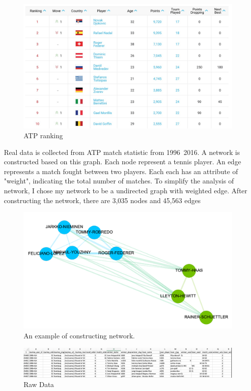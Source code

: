 \documentclass[runningheads]{llncs}
\begin{document}
\begin{figure}[H]
\centering
\includegraphics[scale=0.4]{ATP_ranking}
\caption{ATP ranking} \label{fig_0_atp_ranking}
\end{figure}


Real data is collected from ATP match statistic from 1996~2016. A network is constructed based on this graph. 
Each node represent a tennis player. An edge represents a match fought between two players. Each each has an attribute of "weight", indicating the total number of matches.
To simplify the analysis of network, I chose my network to be a undirected graph with weighted edge.
After constructing the network, there are 3,035 nodes and 45,563 edges

\begin{figure}[H]
\centering
\includegraphics[scale=0.4]{0_simple_example}
\caption{An example of constructing network.} \label{fig_0_simple_example}
\end{figure}

\begin{figure}[H]
\includegraphics[width=\textwidth]{0_rawcsvdata}
\caption{Raw Data} \label{fig_rawdata}
\end{figure}
\end{document}
